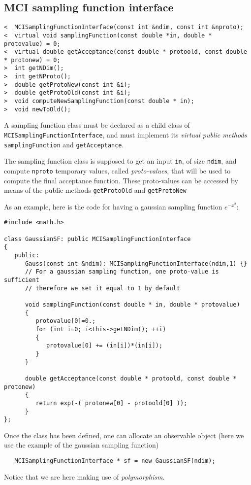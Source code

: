 \documentclass[11pt,a4paper,twoside]{article}
\begin{document}
\subsection{MCI sampling function interface} %
\label{sub:mci_sampling_function_interface}

\begin{verbatim}
<  MCISamplingFunctionInterface(const int &ndim, const int &nproto);
<  virtual void samplingFunction(const double *in, double * protovalue) = 0;
<  virtual double getAcceptance(const double * protoold, const double * protonew) = 0;
>  int getNDim();
>  int getNProto();
>  double getProtoNew(const int &i);
>  double getProtoOld(const int &i);
>  void computeNewSamplingFunction(const double * in);
>  void newToOld();
\end{verbatim}

A sampling function class must be declared as a child class of \verb+MCISamplingFunctionInterface+, and must implement its \emph{virtual public methods} \verb+samplingFunction+ and \verb+getAcceptance+.

The sampling function class is supposed to get an input \verb+in+, of size \verb+ndim+, and compute \verb+nproto+ temporary values, called \emph{proto-values}, that will be used to compute the final acceptance function.
These proto-values can be accessed by means of the public methods \verb+getProtoOld+ and \verb+getProtoNew+

As an example, here is the code for having a gaussian sampling function $e^{-x^2}$:
\begin{verbatim}
#include <math.h>

class GaussianSF: public MCISamplingFunctionInterface
{
   public:
      Gauss(const int &ndim): MCISamplingFunctionInterface(ndim,1) {}
      // For a gaussian sampling function, one proto-value is sufficient
      // therefore we set it equal to 1 by default

      void samplingFunction(const double * in, double * protovalue)
      {
         protovalue[0]=0.;
         for (int i=0; i<this->getNDim(); ++i)
         {
            protovalue[0] += (in[i])*(in[i]);
         }
      }

      double getAcceptance(const double * protoold, const double * protonew)
      {
         return exp(-( protonew[0] - protoold[0] ));
      }
};
\end{verbatim}

Once the class has been defined, one can allocate an observable object (here we use the example of the gaussian sampling function)
\begin{verbatim}
   MCISamplingFunctionInterface * sf = new GaussianSF(ndim);
\end{verbatim}
Notice that we are here making use of \emph{polymorphism}.
\end{document}

